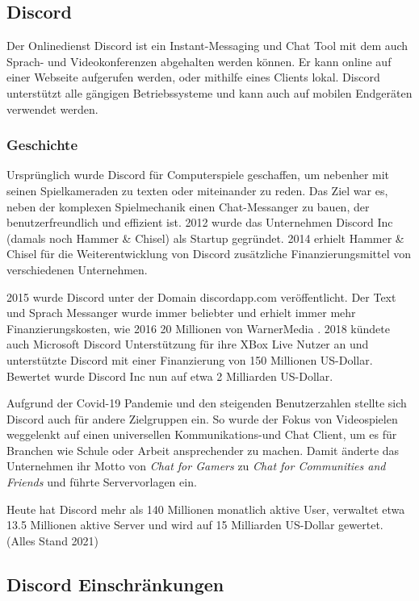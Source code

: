 \documentclass[a4paper]{article}
\begin{document}
\subsection{Discord}
Der Onlinedienst Discord ist ein Instant-Messaging und Chat Tool mit dem auch Sprach- und Videokonferenzen 
abgehalten werden können. Er kann online auf einer Webseite aufgerufen werden, oder mithilfe eines Clients lokal. 
Discord unterstützt alle gängigen Betriebssysteme und kann auch auf mobilen Endgeräten verwendet werden.

\subsubsection{Geschichte}
Ursprünglich wurde Discord für Computerspiele geschaffen, um nebenher mit seinen Spielkameraden zu texten oder
miteinander zu reden. Das Ziel war es, neben der komplexen Spielmechanik einen Chat-Messanger zu bauen, der 
benutzerfreundlich und effizient ist. 2012 wurde das Unternehmen Discord Inc (damals noch Hammer \& Chisel)
als Startup gegründet.\autocite{} 2014 erhielt Hammer \& Chisel für die Weiterentwicklung von Discord zusätzliche
Finanzierungsmittel von verschiedenen Unternehmen.

2015 wurde Discord unter der Domain discordapp.com veröffentlicht. Der Text und Sprach Messanger wurde immer beliebter
und erhielt immer mehr Finanzierungskosten, wie 2016 20 Millionen von WarnerMedia \autocite{} .
2018 kündete auch Microsoft Discord Unterstützung für ihre XBox Live Nutzer an und unterstützte Discord mit einer Finanzierung
von 150 Millionen US-Dollar. Bewertet wurde Discord Inc nun auf etwa 2 Milliarden US-Dollar.

Aufgrund der Covid-19 Pandemie und den steigenden Benutzerzahlen stellte sich Discord auch für andere Zielgruppen ein. 
So wurde der Fokus von Videospielen weggelenkt auf einen universellen Kommunikations-und Chat Client, um es für Branchen 
wie Schule oder Arbeit ansprechender zu machen. Damit änderte das Unternehmen ihr Motto von \textit{Chat for Gamers} zu 
\textit{Chat for Communities and Friends} und führte Servervorlagen ein.

Heute hat Discord mehr als 140 Millionen monatlich aktive User, verwaltet etwa 13.5 Millionen aktive Server und
wird auf 15 Milliarden US-Dollar gewertet. (Alles Stand 2021) \autocite{}

\autocite{discord_wiki}


\subsection{Discord Einschränkungen}
\end{document}
